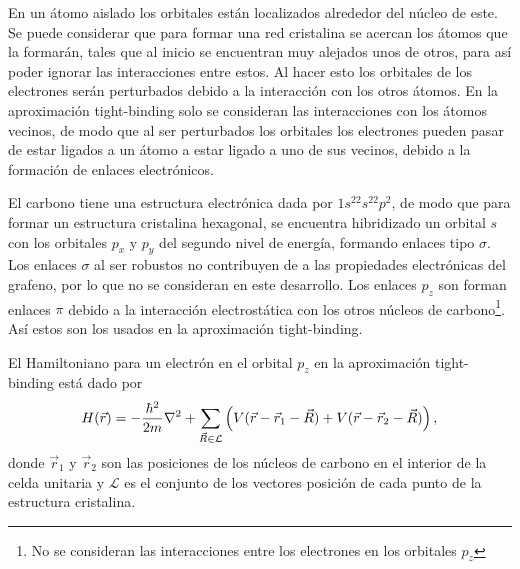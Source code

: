 En un átomo aislado los orbitales están localizados alrededor del núcleo de este. Se puede considerar que para formar una red cristalina se acercan los átomos que la formarán, tales que al inicio se encuentran muy alejados unos de otros, para así poder ignorar las interacciones entre estos. Al hacer esto los orbitales de los electrones serán perturbados debido a la interacción con los otros átomos. En la aproximación tight-binding solo se consideran las interacciones con los átomos vecinos, de modo que al ser perturbados los orbitales los electrones pueden pasar de estar ligados a un átomo a estar ligado a uno de sus vecinos, debido a la formación de enlaces electrónicos.\par
El carbono tiene una estructura electrónica dada por $1s^22s^22p^2$, de modo que para formar un estructura cristalina hexagonal, se encuentra hibridizado un orbital $s$ con los orbitales $p_x$ y $p_y$ del segundo nivel de energía, formando enlaces tipo $\sigma$. Los enlaces $\sigma$ al ser robustos no contribuyen de a las propiedades electrónicas del grafeno\cite{Jena2022}, por lo que no se consideran en este desarrollo. Los enlaces $p_z$ son forman enlaces $\pi$ debido a la interacción electrostática con los otros núcleos de carbono\footnote{No se consideran las interacciones entre los electrones en los orbitales $p_z$}. Así estos son los usados en la aproximación tight-binding.\par
El Hamiltoniano para un electrón en el orbital $p_z$ en la aproximación tight-binding está dado por
\begin{equation}
	H(\vec{r}) = - \frac{\hbar^2}{2m}\laplacian + \sum_{\vec{R}\in \mathcal{L}}\left( V(\vec{r} - \vec{r}_1 - \vec{R}) + V(\vec{r} - \vec{r}_2 - \vec{R})\right),
\end{equation}
donde $\vec{r}_1$ y $\vec{r}_2$ son las posiciones de los núcleos de carbono en el interior de la celda unitaria y $\mathcal{L}$ es el conjunto de los vectores posición de cada punto de la estructura cristalina.
